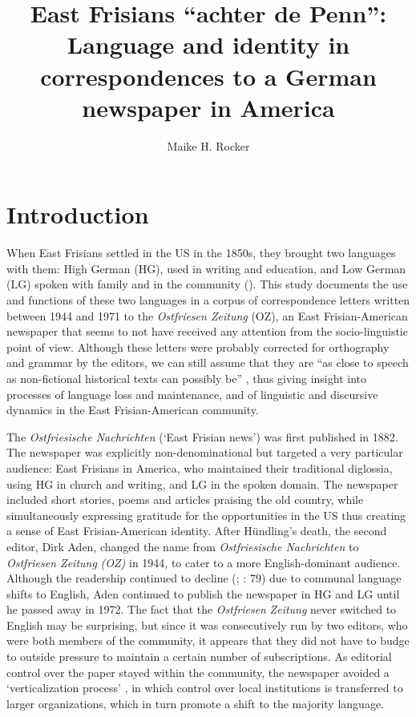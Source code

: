 \documentclass[output=paper]{langsci/langscibook}
\author{Maike H. Rocker\affiliation{The Pennsylvania State University}}
\title[East Frisians ``achter de Penn'']
      {East Frisians ``achter de Penn'': Language and identity in correspondences to a German newspaper in America}
\begin{document}
\maketitle 


\section{Introduction} %
\label{sec:rocker:1}

When East Frisians settled in the US in the 1850s, they brought two languages with them: High German (HG), used in writing and education, and Low German (LG) spoken with family and in the community (\citealt{Schnucker1917, Frizzel1992}). This study documents the use and functions of these two languages in a corpus of correspondence letters written between 1944 and 1971 to the \textit{Ostfriesen Zeitung} (OZ), an East Frisian-American newspaper that seems to not have received any attention from the socio-linguistic point of view. Although these letters were probably corrected for orthography and grammar by the editors, we can still assume that they are “as close to speech as non-fictional historical texts can possibly be” \citep[156]{Elspass2012}, thus giving insight into processes of language loss and maintenance, and of linguistic and discursive dynamics in the East Frisian-American community.

The \textit{Ostfriesische Nachrichten} (‘East Frisian news’) was first published in 1882. The newspaper was explicitly non-denominational but targeted a very particular audience: East Frisians in America, who maintained their traditional diglossia, using HG in church and writing, and LG in the spoken domain. The newspaper included short stories, poems and articles praising the old country, while simultaneously expressing gratitude for the opportunities in the US thus creating a sense of East Frisian-American identity. After Hündling’s death, the second editor, Dirk Aden, changed the name from \textit{Ostfriesische Nachrichten} to \textit{Ostfriesen Zeitung} \textit{(OZ)} in 1944, to cater to a more English-dominant audience. Although the readership continued to decline (\citealt{Monahan1971}; \citealt{Lindaman2004}: 79) due to communal language shifts to English, Aden continued to publish the newspaper in HG and LG until he passed away in 1972. The fact that the \textit{Ostfriesen} \textit{Zeitung} never switched to English may be surprising, but since it was consecutively run by two editors, who were both members of the community, it appears that they did not have to budge to outside pressure to maintain a certain number of subscriptions. As editorial control over the paper stayed within the community, the newspaper avoided a ‘verticalization process’ \citep{Salmons1983}, in which control over local institutions is transferred to larger organizations, which in turn promote a shift to the majority language. 
\end{document}
